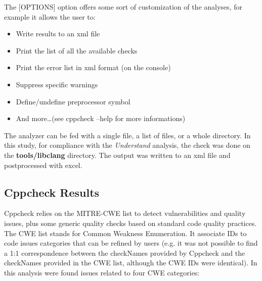 The [OPTIONS] option offers some sort of customization of the analyses, for example it allows the user to:
\begin{itemize}
	\item Write results to an xml file
	\item Print the list of all the available checks
	\item Print the error list in xml format (on the console)
	\item Suppress specific warnings
	\item Define/undefine preprocessor symbol
	\item And more\dots (see cppcheck --help for more informations)
\end{itemize}
The analyzer can be fed with a single file, a list of files, or a whole directory. In this study, for compliance with the \textsl{Understand} analysis, the check was done on the \textbf{tools/libclang} directory.\newline
The output was written to an xml file and postprocessed with excel.

\subsection{Cppcheck Results}

Cppcheck relies on the MITRE-CWE list to detect vulnerabilities and quality issues, plus some generic quality checks based on standard code quality practices.\newline
The CWE list stands for Common Weakness Enumeration. It associate IDs to code issues categories that can be refined by users (e.g. it was not possible to find a 1:1 correspondence between the checkNames provided by Cppcheck and the checkNames provided in the CWE list, although the CWE IDs were identical).
\newline In this analysis were found issues related to four CWE categories:

